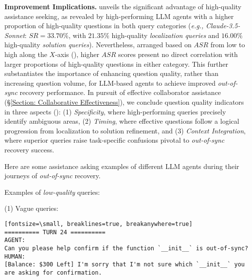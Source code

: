 \textbf{Improvement Implications.}
%
 unveils the significant advantage of high-quality assistance seeking, as revealed by high-performing LLM agents with a higher proportion of high-quality questions in both query categories (\textit{\textit{e.g.,}} \textit{Claude-3.5-Sonnet}: $SR=33.70\%$, with $21.35\%$ high-quality \textit{\textcolor{fig7_blue}{localization queries}} and $16.00\%$ high-quality \textit{\textcolor{fig7_salmon}{solution queries}}).
Nevertheless, arranged based on $ASR$ from low to high along the $X$-axis (), higher $ASR$ scores present no direct correlation with larger proportions of high-quality questions in either category. This further substantiates the importance of enhancing question quality, rather than increasing question volume, for LLM-based agents to achieve improved \textit{out-of-sync} recovery performance.
%
In pursuit of effective collaborator assistance (\S \ref{Section: Collaborative Effectiveness}), we conclude question quality indicators in three aspects (): (1) \textit{Specificity}, where high-performing queries precisely identify ambiguous areas, (2) \textit{Timing}, where effective questions follow a logical progression from localization to solution refinement, and (3) \textit{Context Integration}, where superior queries raise task-specific confusions pivotal to \textit{out-of-sync} recovery success. 






Here are some assistance asking examples of different LLM agents during their journeys of \textit{out-of-sync} recovery.

Examples of \textit{low-quality} queries: 

(1) Vague queries:
\begin{verbatim}[fontsize=\small, breaklines=true, breakanywhere=true]
========== TURN 24 ==========
AGENT:
Can you please help confirm if the function `__init__` is out-of-sync?
HUMAN:
[Balance: $300 Left] I'm sorry that I'm not sure which `__init__` you are asking for confirmation.
\end{verbatim}


